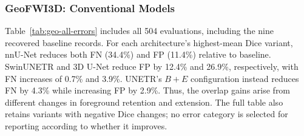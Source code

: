 \documentclass[12pt,a4paper]{article}
\begin{document}
\subsubsection{GeoFWI3D: Conventional Models}

Table~\ref{tab:geo-all-errors} includes all 504 evaluations, including
the nine recovered baseline records. For each architecture's highest-mean
Dice variant, nnU-Net reduces both FN (34.4\%) and FP (11.4\%) relative
to baseline. SwinUNETR and 3D U-Net reduce FP by 12.4\% and 26.9\%,
respectively, with FN increases of 0.7\% and 3.9\%. UNETR's $B+E$
configuration instead reduces FN by 4.3\% while increasing FP by 2.9\%.
Thus, the overlap gains arise from different changes in foreground
retention and extension. The full table also retains variants with
negative Dice changes; no error category is selected for reporting
according to whether it improves.
\end{document}
